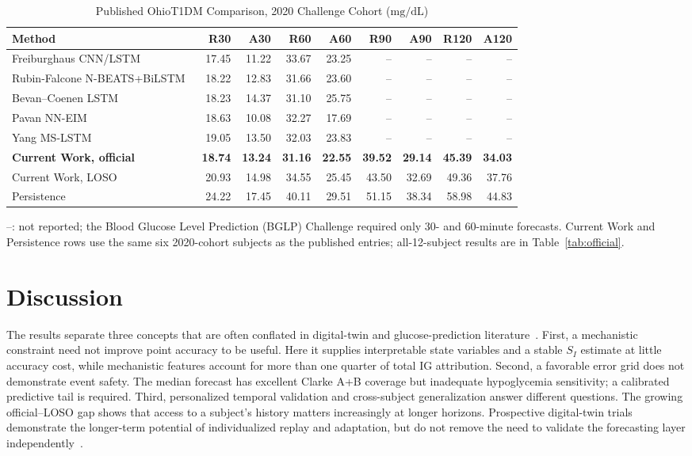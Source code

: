 \documentclass[journal]{IEEEtran}
\begin{document}
\begin{table}[t]
\centering
\caption{Published OhioT1DM Comparison, 2020 Challenge Cohort ($\mathrm{mg/dL}$)}
\label{tab:published}
\footnotesize
\begin{tabular}{lrrrrrrrr}
\toprule
Method & R30 & A30 & R60 & A60 & R90 & A90 & R120 & A120 \\
\midrule
Freiburghaus CNN/LSTM~\cite{ref63} & 17.45 & 11.22 & 33.67 & 23.25 & -- & -- & -- & -- \\
Rubin-Falcone N-BEATS+BiLSTM~\cite{ref62} & 18.22 & 12.83 & 31.66 & 23.60 & -- & -- & -- & -- \\
Bevan--Coenen LSTM~\cite{ref61} & 18.23 & 14.37 & 31.10 & 25.75 & -- & -- & -- & -- \\
Pavan NN-EIM~\cite{ref60} & 18.63 & 10.08 & 32.27 & 17.69 & -- & -- & -- & -- \\
Yang MS-LSTM~\cite{ref64} & 19.05 & 13.50 & 32.03 & 23.83 & -- & -- & -- & -- \\
\textbf{Current Work, official} & \textbf{18.74} & \textbf{13.24} & \textbf{31.16} & \textbf{22.55} & \textbf{39.52} & \textbf{29.14} & \textbf{45.39} & \textbf{34.03} \\
Current Work, LOSO & 20.93 & 14.98 & 34.55 & 25.45 & 43.50 & 32.69 & 49.36 & 37.76 \\
Persistence & 24.22 & 17.45 & 40.11 & 29.51 & 51.15 & 38.34 & 58.98 & 44.83 \\
\bottomrule
\end{tabular}

\vspace{2pt}
\raggedright\footnotesize
--: not reported; the Blood Glucose Level Prediction (BGLP) Challenge required only 30- and 60-minute forecasts. Current Work and Persistence rows use the same six 2020-cohort subjects as the published entries; all-12-subject results are in Table~\ref{tab:official}.
\end{table}




\section{Discussion}

The results separate three concepts that are often conflated in digital-twin and glucose-prediction literature~\cite{ref2}. First, a mechanistic constraint need not improve point accuracy to be useful. Here it supplies interpretable state variables and a stable $S_I$ estimate at little accuracy cost, while mechanistic features account for more than one quarter of total IG attribution. Second, a favorable error grid does not demonstrate event safety. The median forecast has excellent Clarke A+B coverage but inadequate hypoglycemia sensitivity; a calibrated predictive tail is required. Third, personalized temporal validation and cross-subject generalization answer different questions. The growing official--LOSO gap shows that access to a subject's history matters increasingly at longer horizons. Prospective digital-twin trials demonstrate the longer-term potential of individualized replay and adaptation, but do not remove the need to validate the forecasting layer independently~\cite{ref18}.
\end{document}
